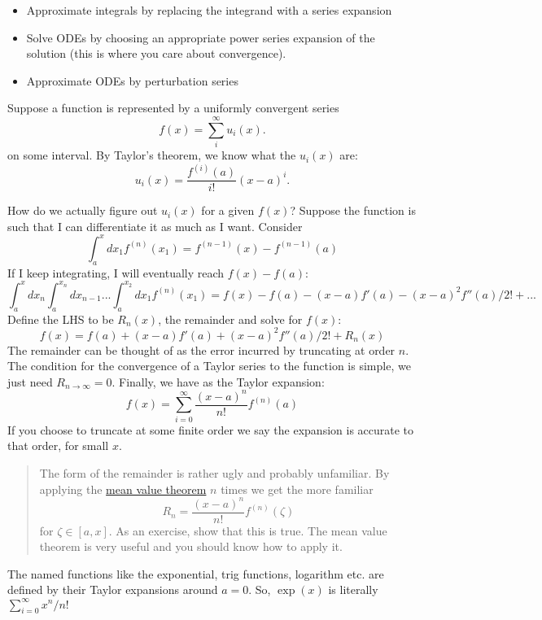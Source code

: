 \documentclass[11pt]{article}
\providecommand{\tightlist}{%
      \setlength{\itemsep}{0pt}\setlength{\parskip}{0pt}}
\begin{document}
\begin{itemize}
\tightlist
\item
  Approximate integrals by replacing the integrand with a series
  expansion
\item
  Solve ODEs by choosing an appropriate power series expansion of the
  solution (this is where you care about convergence).
\item
  Approximate ODEs by perturbation series
\end{itemize}

Suppose a function is represented by a uniformly convergent series \[
f(x)=\sum_i^\infty u_i(x) .
\] on some interval. By Taylor's theorem, we know what the $u_i(x)$ are:
$$
u_i(x) = \frac{f^{(i)}(a)}{i!}(x-a)^i.
$$

\begin{tcolorbox}[title=Taylor expansions]

How do we actually figure out \(u_i(x)\) for a
given \(f(x)\)? Suppose the function is such that I can differentiate it
as much as I want. Consider \[
\int_a^xdx_1f^{(n)}(x_1)=f^{(n-1)}(x)-f^{(n-1)}(a)
\] If I keep integrating, I will eventually reach \(f(x)-f(a)\): \[
\int_a^xdx_n\int_{a}^{x_n}dx_{n-1}...\int_a^{x_2}dx_1f^{(n)}(x_1)=f(x)-f(a)-(x-a)f'(a)-(x-a)^2f''(a)/2!+...
\] Define the LHS to be \(R_n(x)\), the remainder and solve for
\(f(x)\): \[
f(x)=f(a)+(x-a)f'(a)+(x-a)^2f''(a)/2!+R_n(x)
\] 
The remainder can be thought of as the error incurred by truncating
at order \(n\). The condition for the convergence of a Taylor series to
the function is simple, we just need \(R_{n\to\infty}=0\). Finally, we
have as the Taylor expansion: \[
f(x) = \sum^\infty_{i=0}\frac{(x-a)^n}{n!}f^{(n)}(a)
\] If you choose to truncate at some finite order we say the expansion
is accurate to that order, for small \(x\).

\begin{quote}
The form of the remainder is rather ugly and probably unfamiliar. By
applying the
\href{https://en.wikipedia.org/wiki/Mean_value_theorem}{mean value
theorem} \(n\) times we get the more familiar \[
R_n = \frac{(x-a)^n}{n!} f^{(n)}(\zeta)
\] for \(\zeta\in[a, x]\). As an exercise, show that this is true. The
mean value theorem is very useful and you should know how to apply it.
\end{quote}
\end{tcolorbox}




The named functions like the exponential, trig functions, logarithm etc.
are defined by their Taylor expansions around \(a=0\). So, \(\exp(x)\)
is literally \(\sum_{i=0}^\infty x^n/n!\)
\end{document}
